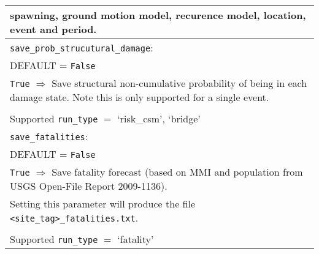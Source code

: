 \begin{tabular}{|p{\textwidth}|}
spawning, ground motion model, recurence model, location, event and period.\\
\hline \vspace{0.1em} \texttt{save\_prob\_strucutural\_damage}: \\
DEFAULT = \texttt{False} \\
\texttt{True} $\Rightarrow$ Save structural non-cumulative
probability of being in each
damage state.  Note this is only supported for a single event. \\
\\
Supported \texttt{run\_type} $=$ `risk\_csm', `bridge' \\
\hline \vspace{0.1em} \texttt{save\_fatalities}: \\
DEFAULT = \texttt{False} \\
\texttt{True} $\Rightarrow$ Save fatality forecast (based on 
  MMI and population from USGS Open-File Report 2009-1136). \\
Setting this parameter will produce the file 
\texttt{<site\_tag>\_}\texttt{fatalities}\texttt{.txt}. \\ 
\\
Supported \texttt{run\_type} $=$ `fatality' \\
\hline
 \end{tabular}
 
